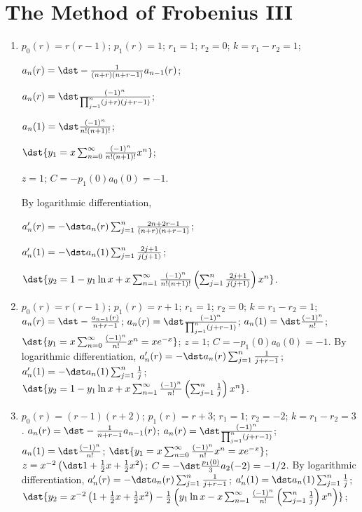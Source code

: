 \documentclass[openany]{book}
\newenvironment{sectionSolutions}{
 \begin{enumerate}[item-label={\thesection.\arabic{enumi}.}]
}{
 \end{enumerate}
}
\begin{document}
\section{The Method of Frobenius III}

\begin{sectionSolutions}
\item
$p_0(r)=r(r-1)$;
$p_1(r)=1$;
$r_1=1$; $r_2=0$; $k=r_1-r_2=1$;

$a_n(r)=\dst-\frac{1}{(n+r)(n+r-1)}
a_{n-1}(r)$;


 $a_n(r)=\dst\frac{(-1)^n}{\prod_{j=1}^n(j+r)(j+r-1)}$;

$a_n(1)=\dst\frac{(-1)^n}{ n!(n+1)!}$;

$\dst{y_1=x\sum_{n=0}^\infty\frac{(-1)^n}{ n!(n+1)!}x^n}$;

$z=1$; $C=-p_1(0)a_0(0)=-1$.

By logarithmic differentiation,

$a_n'(r)=-\dst a_n(r)\sum_{j=1}^n\frac{2n+2r-1}{(n+r)(n+r-1)}$;

$a_n'(1)=-\dst a_n(1)\sum_{j=1}^n\frac{2j+1}{ j(j+1)}$;

$\dst{y_2=1-y_1\ln x
+x\sum_{n=1}^\infty\frac{(-1)^n}{
n!(n+1)!}\left(\sum_{j=1}^n\frac{2j+1}{ j(j+1)}\right)x^n}$.


\item
$p_0(r)=r(r-1)$;
$p_1(r)=r+1$;
$r_1=1$; $r_2=0$; $k=r_1-r_2=1$;
$a_n(r)=\dst-\frac{a_{n-1}(r)}{ n+r-1}$;
 $a_n(r)=\dst\frac{(-1)^n}{\prod_{j=1}^n(j+r-1)}$;
$a_n(1)=\dst\frac{(-1)^n}{ n!}$;
$\dst{y_1=x\sum_{n=0}^\infty\frac{(-1)^n}{ n!}x^n=xe^{-x}}$;
$z=1$;
$C=-p_1(0)a_0(0)=-1$.
By logarithmic differentiation,
$a_n'(r)=-\dst a_n(r)\sum_{j=1}^n\frac{1}{ j+r-1}$;
$a_n'(1)=-\dst a_n(1)\sum_{j=1}^n\frac{1}{ j}$;
$\dst{y_2=1-y_1\ln x+x\sum_{n=1}^\infty\frac{(-1)^n}{
n!}\left(\sum_{j=1}^n\frac{1}{ j}\right)x^n}$.


\item
$p_0(r)=(r-1)(r+2)$;
$p_1(r)=r+3$;
$r_1=1$; $r_2=-2$; $k=r_1-r_2=3$.
$a_n(r)=\dst-\frac{1}{ n+r-1}
a_{n-1}(r)$;
 $a_n(r)=\dst\frac{(-1)^n}{\prod_{j=1}^n(j+r-1)}$;
$a_n(1)=\dst\frac{(-1)^n}{ n!}$;
$\dst{y_1=x\sum_{n=0}^\infty\frac{(-1)^n}{ n!}x^n=xe^{-x}}$;
$z=x^{-2}\left(\dst1+\frac{1}{2}x+\frac{1}{2}x^2\right)$;
$C=-\dst\frac{p_1(0)}{ 3}a_2(-2)=-1/2$.
By logarithmic differentiation,
$a_n'(r)=-\dst a_n(r)\sum_{j=1}^n\frac{1}{ j+r-1}$;
$a_n'(1)=\dst a_n(1)\sum_{j=1}^n\frac{1}{ j}$;
 $\dst{y_2=x^{-2}\left(1+\frac{1}{2}x+\frac{1}{2}x^2\right)-\frac{1}{2}
\left(y_1\ln x-x\sum_{n=1}^\infty\frac{(-1)^n}{
n!}\left(\sum_{j=1}^n\frac{1}{ j}\right)x^n\right)}$;



\end{sectionSolutions}
\end{document}
